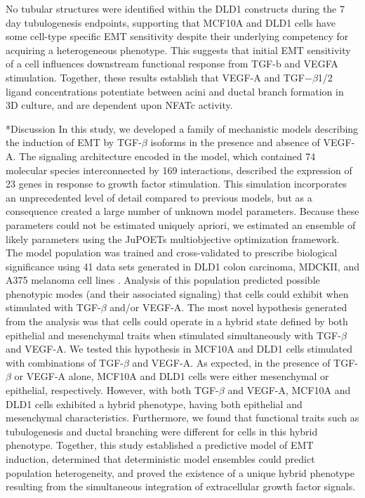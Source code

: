 \documentclass[12pt]{article}
\makeatletter
\renewcommand\section{\@startsection
	{subsection}{2}{0mm}
	{-0.2in}
	{0.05\baselineskip}
	{\normalfont\large\bfseries}}
\makeatother
\begin{document}
No tubular structures were identified within the DLD1 constructs during the 7 day tubulogenesis endpoints, supporting that MCF10A and DLD1 cells have some cell-type specific EMT sensitivity despite their underlying competency for acquiring a heterogeneous phenotype. This suggests that initial EMT sensitivity of a cell influences downstream functional response from TGF-b and VEGFA stimulation.
Together, these results establish that VEGF-A and TGF$-\beta$1/2 ligand concentrations potentiate between acini and ductal branch formation in 3D culture, and are dependent upon NFATc activity.


\clearpage

\section*{Discussion}
In this study, we developed a family of mechanistic models describing the induction of EMT by TGF-$\beta$ isoforms in the presence and absence of VEGF-A.
The signaling architecture encoded in the model, which contained 74 molecular species interconnected by 169 interactions,
described the expression of 23 genes in response to growth factor stimulation.
This simulation incorporates an unprecedented level of detail compared to previous models, but as a consequence created a large number of unknown model parameters.
Because these parameters could not be estimated uniquely apriori, we estimated an ensemble of likely parameters using the JuPOETs multiobjective optimization framework.
The model population was trained and cross-validated to prescribe biological significance using 41 data sets generated in DLD1 colon carcinoma, MDCKII, and A375 melanoma cell lines \citep{Medici:2008fk}.
Analysis of this population predicted possible phenotypic modes (and their associated signaling) that cells could exhibit when stimulated with TGF-$\beta$ and/or VEGF-A.
The most novel hypothesis generated from the analysis was that cells could operate in a hybrid state defined by both epithelial and mesenchymal traits when stimulated simultaneously with TGF-$\beta$ and VEGF-A.
We tested this hypothesis in MCF10A and DLD1 cells stimulated with combinations of TGF-$\beta$ and VEGF-A.
As expected, in the presence of TGF-$\beta$ or VEGF-A alone, MCF10A and DLD1 cells were either mesenchymal or epithelial, respectively.
However, with both TGF-$\beta$ and VEGF-A, MCF10A and DLD1 cells exhibited a hybrid phenotype, having both epithelial and mesenchymal characteristics.
Furthermore, we found that functional traits such as tubulogenesis and ductal branching were different for cells in this hybrid phenotype.
Together, this study established a predictive model of EMT induction, determined that deterministic model ensembles could predict population heterogeneity, and proved the existence of a unique hybrid phenotype resulting from the simultaneous integration of extracellular growth factor signals.
\end{document}
